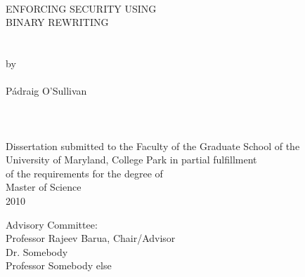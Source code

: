 
\thispagestyle{empty}
\hbox{\ }
\vspace{1in}
\renewcommand{\baselinestretch}{1}
\small\normalsize
\begin{center}

\large{{ENFORCING SECURITY USING \\
BINARY REWRITING}}\\
\ \\
\ \\
\large{by} \\
\ \\
\large{P\'{a}draig O'Sullivan}%
\ \\
\ \\
\ \\
\ \\
\normalsize
Dissertation submitted to the Faculty of the Graduate School of the \\
University of Maryland, College Park in partial fulfillment \\
of the requirements for the degree of \\
Master of Science \\
2010
\end{center}

\vspace{7.5em}

\noindent Advisory Committee: \\
Professor Rajeev Barua, Chair/Advisor \\
Dr. Somebody \\
Professor Somebody else
